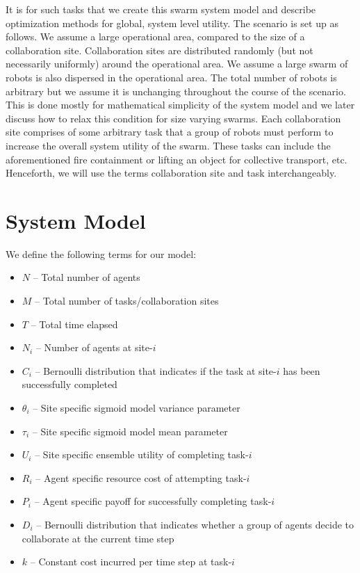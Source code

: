 \documentclass{sage}
\begin{document}
It is for such tasks that we create this swarm system model and describe optimization methods for global, system level utility. The scenario is set up as follows. We assume a large operational area, compared to the size of a collaboration site. Collaboration sites are distributed randomly (but not necessarily uniformly) around the operational area. We assume a large swarm of robots is also dispersed in the operational area. The total number of robots is arbitrary but we assume it is unchanging throughout the course of the scenario. This is done mostly for mathematical simplicity of the system model and we later discuss how to relax this condition for size varying swarms. Each collaboration site comprises of some arbitrary task that a group of robots must perform to increase the overall system utility of the swarm. These tasks can include the aforementioned fire containment or lifting an object for collective transport, etc. Henceforth, we will use the terms collaboration site and task interchangeably.

\section{System Model}
We define the following terms for our model:
\begin{itemize}
	\item $N$   -- Total number of agents
	\item $M$   -- Total number of tasks/collaboration sites
	\item $T$   -- Total time elapsed
	\item $N_i$ -- Number of agents at site-$i$
	\item $C_i$ -- Bernoulli distribution that indicates if the task at site-$i$ has been successfully completed
	\item $\theta_i$ -- Site specific sigmoid model variance parameter
	\item $\tau_i$   -- Site specific sigmoid model mean parameter
	\item $U_i$ -- Site specific ensemble utility of completing task-$i$
	\item $R_i$ -- Agent specific resource cost of attempting task-$i$
	\item $P_i$ -- Agent specific payoff for successfully completing task-$i$
	\item $D_i$ -- Bernoulli distribution that indicates whether a group of agents decide to collaborate at the current time step
	\item $k$   -- Constant cost incurred per time step at task-$i$
\end{itemize}
\end{document}
